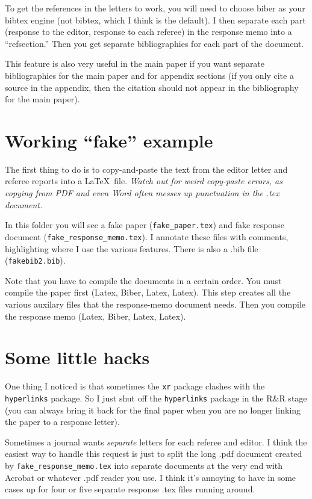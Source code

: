 \documentclass[12pt,pdftex, notitlepage]{article}
\begin{document}
\begin{itemize}
To get the references in the letters to work, you will need to choose biber as your bibtex engine (not bibtex, which I think is the default).  I then separate each part (response to the editor, response to each referee) in the response memo into a ``refsection.''  Then you get separate bibliographies for each part of the document.

This feature is also very useful in the main paper if you want separate bibliographies for the main paper and for appendix sections (if you only cite a source in the appendix, then the citation should not appear in the bibliography for the main paper).

\section{Working ``fake'' example}

The first thing to do is to copy-and-paste the text from the editor letter and referee reports into a \LaTeX\ file.  \textit{Watch out for weird copy-paste errors, as copying from PDF and even Word often messes up punctuation in the .tex document.}

In this folder you will see a fake paper (\texttt{fake\_paper.tex}) and fake response document (\texttt{fake\_response\_memo.tex}).  I annotate these files with comments, highlighting where I use the various features.  There is also a .bib file (\texttt{fakebib2.bib}).

Note that you have to compile the documents in a certain order.  You must compile the paper first (Latex, Biber, Latex, Latex).  This step creates all the various auxilary files that the response-memo document needs.  Then you compile the response memo (Latex, Biber, Latex, Latex).



\section{Some little hacks}

One thing I noticed is that sometimes the  \texttt{xr} package clashes with the \texttt{hyperlinks} package.  So I just shut off the \texttt{hyperlinks} package in the R\&R stage (you can always bring it back for the final paper when you are no longer linking the paper to a response letter).

Sometimes a journal wants \textit{separate} letters for each referee and editor.  I think the easiest way to handle this request is just to split the long .pdf document created by \texttt{fake\_response\_memo.tex} into separate documents at the very end with Acrobat or whatever .pdf reader you use.  I think it's annoying to have in some cases up for four or five separate response .tex files running around.


\end{itemize}
\end{document}
